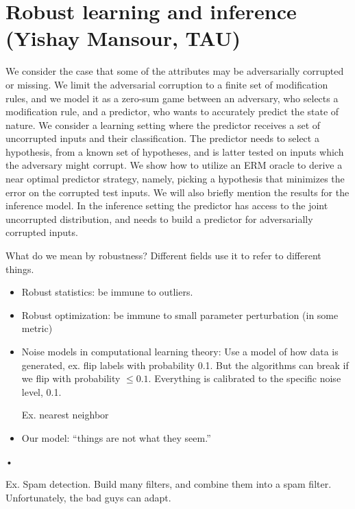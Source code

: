 \section{Robust learning and inference (Yishay Mansour, TAU)}

We consider the case that some of the attributes may be adversarially corrupted or missing. We limit the adversarial corruption to a finite set of modification rules, and we model it as a zero-sum game between an adversary, who selects a modification rule, and a predictor, who wants to accurately predict the state of nature. We consider a learning setting where the predictor receives a set of uncorrupted inputs and their classification. The predictor needs to select a hypothesis, from a known set of hypotheses, and is latter tested on inputs which the adversary might corrupt. We show how to utilize an ERM oracle to derive a near optimal predictor strategy, namely, picking a hypothesis that minimizes the error on the corrupted test inputs. We will also briefly mention the results for the inference model. In the inference setting the predictor has access to the joint uncorrupted distribution, and needs to build a predictor for adversarially corrupted inputs.



What do we mean by robustness? Different fields use it to refer to different things. %
\begin{itemize}
\item
Robust statistics: be immune to outliers. 
\item
Robust optimization: be immune to small parameter perturbation (in some metric)
\item
Noise models in computational learning theory: Use a model of how data is generated, ex. flip labels with probability 0.1. But the algorithms can break if we flip with probability $\le 0.1$. Everything is calibrated to the specific noise level, 0.1.

 
Ex. nearest neighbor %
\item
Our model: ``things are not what they seem.''
\end{itemize}•

Ex. Spam detection. Build many filters, and combine them into a spam filter. Unfortunately, the bad guys can adapt.

